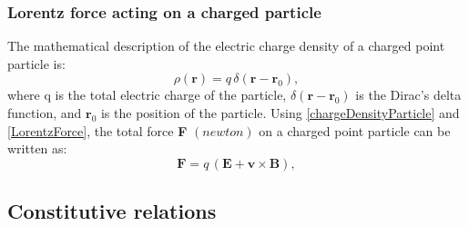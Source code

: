 \subsubsection{Lorentz force acting on a charged particle}

The mathematical description of the electric charge density of a charged point particle is:
\begin{equation}
	\rho(\mathbf{r}) = q\,\delta(\mathbf{r}-\mathbf{r}_{0}),\label{chargeDensityParticle}
\end{equation}
where q is the total electric charge of the particle, $\delta(\mathbf{r}-\mathbf{r}_{0})$ is the Dirac's delta function, and $\mathbf{r}_{0}$ is the position of the particle. Using \eqref{chargeDensityParticle} and \eqref{LorentzForce}, the total force \textbf{F} $\left(newton\right)$ on a charged point particle can be written as:
\begin{equation}
	\mathbf{F} = q\,(\mathbf{E} + \mathbf{v}\times\mathbf{B}),\label{LorentzForceParticle}
\end{equation}

\subsection{Constitutive relations}\label{ConstitutiveRelationsTheory}

